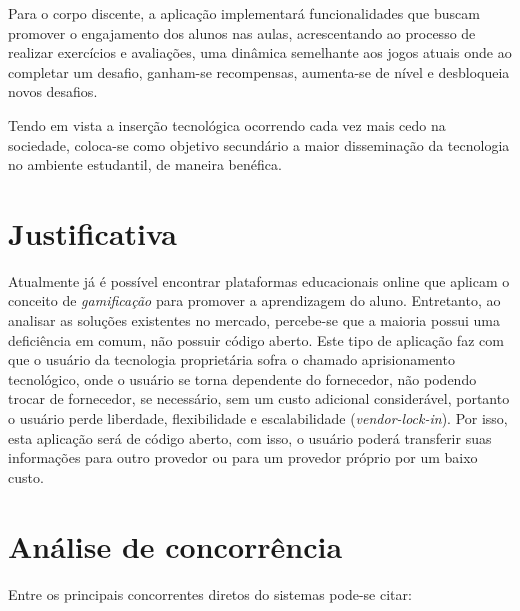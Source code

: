 Para o corpo discente, a aplicação implementará funcionalidades que buscam promover o engajamento dos alunos nas aulas, acrescentando ao processo de realizar exercícios e avaliações, uma dinâmica semelhante aos jogos atuais onde ao completar um desafio, ganham-se recompensas, aumenta-se de nível e desbloqueia novos desafios.

Tendo em vista a inserção tecnológica ocorrendo cada vez mais cedo na sociedade, coloca-se como objetivo secundário a maior disseminação da tecnologia no ambiente estudantil, de maneira benéfica.

\section{Justificativa}
Atualmente já é possível encontrar plataformas educacionais online que aplicam o conceito de \textit{gamificação} para promover a aprendizagem do aluno. Entretanto, ao analisar as soluções existentes no mercado, percebe-se que a maioria possui uma deficiência em comum, não possuir código aberto. Este tipo de aplicação faz com que o usuário da tecnologia proprietária sofra o chamado aprisionamento tecnológico, onde o usuário se torna dependente do fornecedor, não podendo trocar de fornecedor, se necessário, sem um custo adicional considerável, portanto o usuário perde liberdade, flexibilidade e escalabilidade (\textit{\gls{vendor-lock-in}}). Por isso, esta aplicação será de código aberto, com isso, o usuário poderá transferir suas informações para outro provedor ou para um provedor próprio por um baixo custo.


\section{Análise de concorrência}
Entre os principais concorrentes diretos do sistemas pode-se citar:

